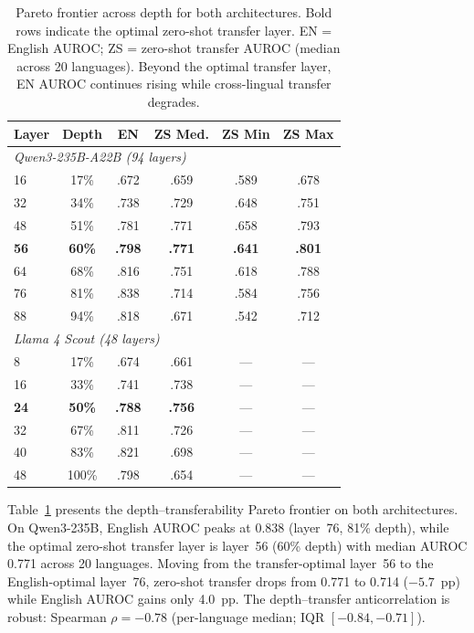 \documentclass[11pt,a4paper]{article}
\begin{document}
\begin{table}[t]
\centering
\small
\begin{tabular}{@{}lccccc@{}}
\toprule
\textbf{Layer} & \textbf{Depth} & \textbf{EN} & \textbf{ZS Med.} & \textbf{ZS Min} & \textbf{ZS Max} \\
\midrule
\multicolumn{6}{l}{\emph{Qwen3-235B-A22B (94 layers)}} \\
\midrule
16 & 17\% & .672 & .659 & .589 & .678 \\
32 & 34\% & .738 & .729 & .648 & .751 \\
48 & 51\% & .781 & .771 & .658 & .793 \\
\textbf{56} & \textbf{60\%} & \textbf{.798} & \textbf{.771} & \textbf{.641} & \textbf{.801} \\
64 & 68\% & .816 & .751 & .618 & .788 \\
76 & 81\% & .838 & .714 & .584 & .756 \\
88 & 94\% & .818 & .671 & .542 & .712 \\
\midrule
\multicolumn{6}{l}{\emph{Llama 4 Scout (48 layers)}} \\
\midrule
8  & 17\% & .674 & .661 & --- & --- \\
16 & 33\% & .741 & .738 & --- & --- \\
\textbf{24} & \textbf{50\%} & \textbf{.788} & \textbf{.756} & --- & --- \\
32 & 67\% & .811 & .726 & --- & --- \\
40 & 83\% & .821 & .698 & --- & --- \\
48 & 100\% & .798 & .654 & --- & --- \\
\bottomrule
\end{tabular}
\caption{Pareto frontier across depth for both architectures. Bold rows indicate the optimal zero-shot transfer layer. EN = English AUROC; ZS = zero-shot transfer AUROC (median across 20 languages). Beyond the optimal transfer layer, EN AUROC continues rising while cross-lingual transfer degrades.}
\label{tab:pareto}
\end{table}

Table~\ref{tab:pareto} presents the depth--transferability Pareto frontier on both architectures.
On Qwen3-235B, English AUROC peaks at 0.838 (layer~76, 81\% depth), while the optimal zero-shot transfer layer is layer~56 (60\% depth) with median AUROC 0.771 across 20 languages.
Moving from the transfer-optimal layer~56 to the English-optimal layer~76, zero-shot transfer drops from 0.771 to 0.714 ($-5.7$~pp) while English AUROC gains only 4.0~pp.
The depth--transfer anticorrelation is robust: Spearman $\rho = -0.78$ (per-language median; IQR $[-0.84, -0.71]$).
\end{document}

